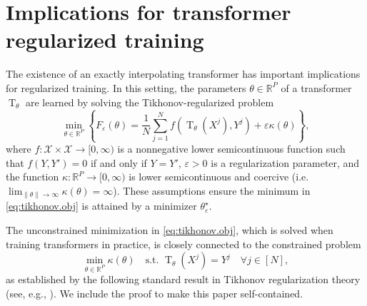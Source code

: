 \documentclass[pdflatex,sn-mathphys-num]{sn-jnl}%
\theoremstyle{thmstyleone}%
\theoremstyle{thmstyletwo}%
\theoremstyle{thmstylethree}%
\numberwithin{equation}{section}
\newcommand{\R}{\mathbb{R}}
\DeclareMathOperator{\T}{\mathrm{T}}
\begin{document}
\section{Implications for transformer regularized training}\label{sec:implicationsTraining}

The existence of an exactly interpolating transformer has important implications for regularized training.  
In this setting, the parameters $\theta \in \R^P$ of a transformer $\T_\theta$ are learned by solving the Tikhonov-regularized problem
\begin{equation}\label{eq:tikhonov.obj}
\min_{\theta \in \mathbb{R}^P} \left\{ F_\varepsilon(\theta) = \frac{1}{N}\sum_{j=1}^N f(\T_\theta (X^j), Y^j) + \varepsilon \kappa(\theta) \right\},
\end{equation}
where $f : \mathcal{X} \times \mathcal{X} \to [0,\infty)$ is a nonnegative lower semicontinuous function such that $f(Y, Y') = 0$ if and only if $Y = Y'$, $\varepsilon > 0$ is a regularization parameter, and the function $\kappa : \mathbb{R}^P \to [0,\infty)$ is lower semicontinuous and coercive (i.e. $\lim_{\|\theta\| \to \infty} \kappa(\theta) = \infty$). These assumptions ensure the minimum in \eqref{eq:tikhonov.obj} is attained by a minimizer $\theta_\varepsilon^\star$.

The unconstrained minimization in \eqref{eq:tikhonov.obj}, which is solved when training transformers in practice, is closely connected to the constrained problem
\begin{equation}\label{eq:tikhonov.constObj}
        \min_{\theta \in \mathbb{R}^P} \kappa(\theta) \quad \text{s.t. }  \T_\theta(X^j) = Y^j \quad \forall j \in [N],
    \end{equation}
as established by the following standard result in Tikhonov regularization theory (see, e.g., \cite{Engl1996Regularization}). We include the proof to make this paper self-contained.
\end{document}

